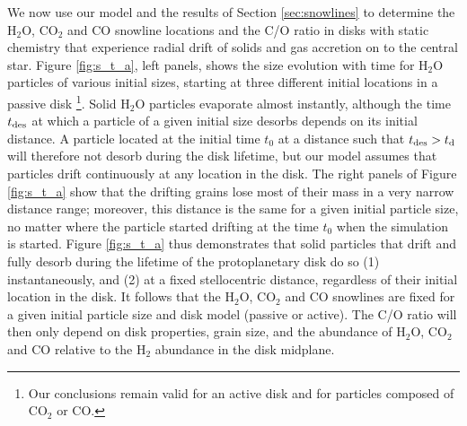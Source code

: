 \documentclass[apj]{emulateapj}
\begin{document}
We now use our model and the results of Section \ref{sec:snowlines} to determine the H$_2$O, CO$_2$ and CO snowline locations and the C/O ratio in disks with static chemistry that experience radial drift of solids and gas accretion on to the central star. Figure \ref{fig:s_t_a}, left panels, shows the size evolution with time for H$_2$O particles of various initial sizes, starting at three different initial locations in a passive disk \footnote{Our conclusions remain valid for an active disk and for particles composed of CO$_2$ or CO.}.  Solid H$_2$O particles evaporate almost instantly, although the time $t_{\rm des}$ at which a particle of a given initial size desorbs depends on its initial distance. A particle located at the initial time $t_0$ at a distance such that $t_{\rm des}>t_{\rm d}$ will therefore not desorb during the disk lifetime, but our model assumes that particles drift continuously at any location in the disk. The right panels of Figure \ref{fig:s_t_a} show that the drifting grains lose most of their mass in a very narrow distance range; moreover, this distance is the same for a given initial particle size, no matter where the particle started drifting at the time $t_0$ when the simulation is started. Figure \ref{fig:s_t_a} thus demonstrates that solid particles that drift and fully desorb during the lifetime of the protoplanetary disk do so (1) instantaneously, and (2) at a fixed stellocentric distance, regardless of their initial location in the disk. 
It follows that the H$_2$O, CO$_2$ and CO snowlines are fixed for a given initial particle size and disk model (passive or active). The C/O ratio will then only depend on disk properties, grain size, and the abundance of H$_2$O, CO$_2$ and CO relative to the H$_2$ abundance in the disk midplane. 
\end{document}
